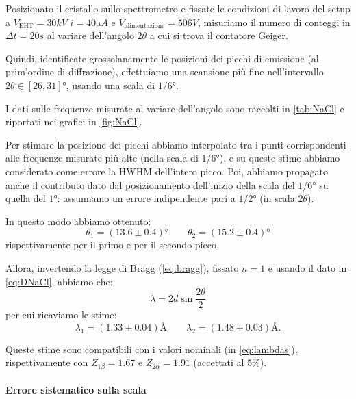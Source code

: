 Posizionato il cristallo sullo spettrometro e fissate le condizioni di lavoro del setup a $ V_\text{EHT} = 30 \unit{kV} $ $ i = 40 \unit{\micro A} $ e $ V_\text{alimentazione} = 506 \unit{V} $, misuriamo il numero di conteggi in $ \Delta t = 20 \unit{s} $ al variare dell'angolo $ 2\theta $ a cui si trova il contatore Geiger.

Quindi, identificate grossolanamente le posizioni dei picchi di emissione (al prim'ordine di diffrazione), effettuiamo una scansione più fine nell'intervallo $ 2\theta \in [26, 31] \unit{\degree} $, usando una scala di $ 1/6 \unit{\degree} $.

I dati sulle frequenze misurate al variare dell'angolo sono raccolti in \cref{tab:NaCl} e riportati nei grafici in \cref{fig:NaCl}.

Per stimare la posizione dei picchi abbiamo interpolato tra i punti corrispondenti alle frequenze misurate più alte (nella scala di $ 1/6 \unit{\degree} $), e su queste stime abbiamo considerato come errore la HWHM dell'intero picco.
Poi, abbiamo propagato anche il contributo dato dal posizionamento dell'inizio della scala del $ 1/6 \unit{\degree} $ su quella del $ 1 \unit{\degree} $: assumiamo un errore indipendente pari a $ 1/2 \unit{\degree} $ (in scala $ 2 \theta $).

In questo modo abbiamo ottenuto:
\begin{equation} \label{eq:NaCl1}
\theta_1 = (13.6 \pm 0.4) \unit{\degree} \qquad \theta_2 = (15.2 \pm 0.4) \unit{\degree}
\end{equation}
rispettivamente per il primo e per il secondo picco.

Allora, invertendo la legge di Bragg (\ref{eq:bragg}), fissato $ n=1 $ e usando il dato in \cref{eq:DNaCl}, abbiamo che:
\begin{equation}
\lambda = 2d \sin \frac{2\theta}{2}
\end{equation}
per cui ricaviamo le stime:
\begin{equation} \label{eq:lambdasNaCl}
\lambda_1 = (1.33 \pm 0.04) \unit{\angstrom} \qquad \lambda_2 = (1.48 \pm 0.03) \unit{\angstrom}.
\end{equation}

Queste stime sono compatibili con i valori nominali (in \cref{eq:lambdas}), rispettivamente con $ Z_{1\beta} = 1.67 $ e $ Z_{2\alpha} = 1.91 $ (accettati al $ 5 \% $).

\paragraph{Errore sistematico sulla scala}

